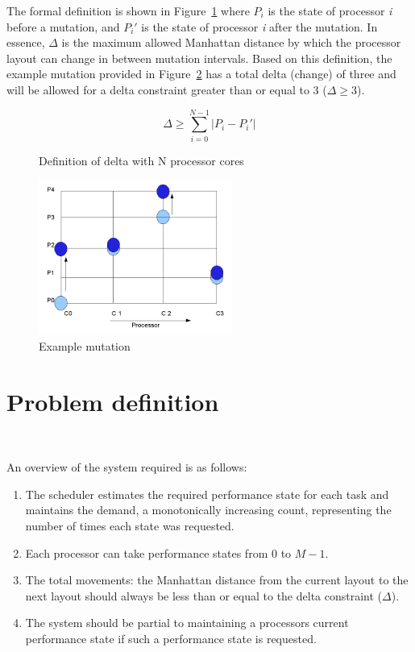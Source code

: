 The formal definition is shown in Figure~\ref{fig:Delta_def} where $P_{i}$ is the state of processor \textit{i} 
before a mutation, and $P_{i}'$ is the state of processor \textit{i} after the mutation.
In essence, $\Delta$ is the maximum allowed Manhattan distance by which the processor layout can change in between mutation intervals. 
Based on this definition, the example mutation provided in Figure~\ref{fig:ex_mutation} has 
a total delta (change) of three and will be allowed for a delta constraint greater than
or equal to 3 ($\Delta \geq 3$).

\begin{figure}[h!]
\centering
\begin{equation*}
    \Delta \geq \displaystyle\sum_{i=0}^{N-1} {| P_{i} - P_{i}' |}
\end{equation*}
\caption{Definition of delta with N processor cores}
\label{fig:Delta_def}
\end{figure}

\begin{figure}[h!]
  \begin{center}
    \includegraphics[height=2in]{figures/example_mutation_3.png}%
    \caption{Example mutation}
    \label{fig:ex_mutation}
  \end{center}
\end{figure}



\section{Problem definition}~\label{sec:ago}

An overview of the system required is as follows:
\begin{enumerate}
\item The scheduler estimates the required performance state for each task and maintains the demand, 
a monotonically increasing count, representing the number of times each state was requested. 
\item Each processor can take performance states from $0$ to $M-1$. 
\item The total movements: the Manhattan distance from the current layout to the next layout 
should always be less than or equal to the delta constraint ($\Delta$). 
\item The system should be partial to maintaining a processors current performance state if such a performance state is requested.
\end{enumerate}

